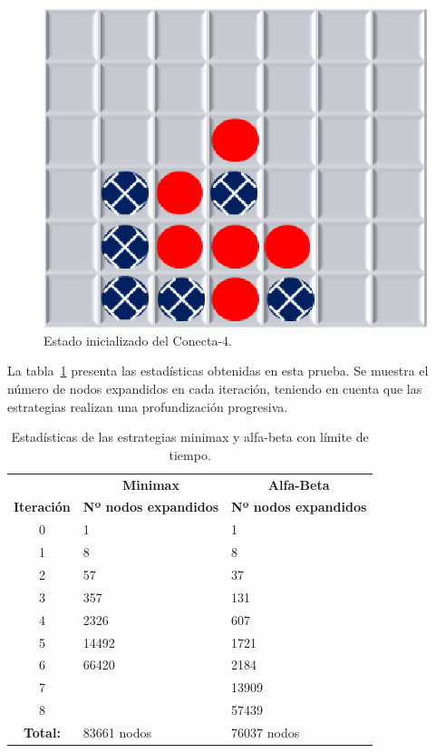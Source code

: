 \begin{figure}[!h]
	\centering
	\includegraphics[scale=0.4]{contenido/cap7/imagenes/ckEstadoActual.eps}
	\caption{Estado inicializado del Conecta-4.}
	\label{fig:comparativa_minimax_alfabeta2}
\end{figure} 

La tabla~\ref{tab:comparativa_minimax_alfabeta2} presenta las estadísticas obtenidas en esta prueba.
Se muestra el número de nodos expandidos en cada iteración, teniendo en cuenta que las estrategias realizan una profundización progresiva.

\begin{table}[!h]
\centering
\caption[Estadísticas de minimax y alfa-beta con límite de tiempo]{Estadísticas de las estrategias minimax y alfa-beta con límite de tiempo.}
\label{tab:comparativa_minimax_alfabeta2}
\begin{tabular}{c|l|l}
\hline
& \multicolumn{1}{c|}{\textbf{Minimax}} & \multicolumn{1}{c}{\textbf{Alfa-Beta}}\\
\textbf{Iteración} & \textbf{Nº nodos expandidos} & \textbf{Nº nodos expandidos} \\
0 & 1 & 1 \\
1 & 8 & 8 \\
2 & 57 & 37 \\ 
3 & 357 & 131 \\
4 & 2326 & 607 \\
5 & 14492 & 1721 \\
6 & 66420 & 2184 \\
7 &  & 13909 \\
8 &  & 57439 \\
\hline
\textbf{Total:} & 83661 nodos & 76037 nodos\\
\hline
\end{tabular}
\end{table} 

